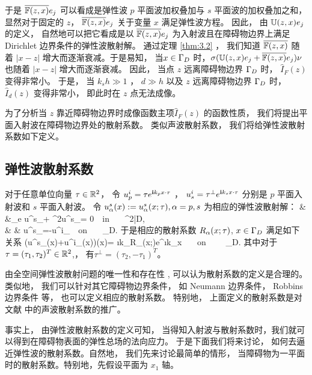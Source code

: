{于是 $\overline{\mathbb{F}(z,x)}e_j$ 可以看成是弹性波 $p$ 平面波加权叠加与 $s$ 平面波的加权叠加之和， 显然对于固定的 $z$， $\overline{\mathbb{F}(z,x)}e_j$ 关于变量 $x$ 满足弹性波方程。 因此， 由 $\mathbb{U}(z,x)e_j$ 的定义， 自然地可以把它看成是以 $\overline{\mathbb{F}(z,x)}e_j$ 为入射波且在障碍物边界上满足 Dirichlet 边界条件的弹性波散射解。 通过定理 \ref{thm:3.2} ， 我们知道 $\overline{\mathbb{F}(z,x)}$ 随着 $|x-z|$ 增大而逐渐衰减。于是易知， 当$x\in \Gamma_D$ 时，$\sigma(\mathbb{U}(z,x)e_j+\overline{\mathbb{F}(z,x)}e_j)\nu$ 也随着 $|x-z|$ 增大而逐渐衰减。 因此， 当点 $z$ 远离障碍物边界 $\Gamma_D$ 时， $\hat{I}_F(z)$ 变得非常小。 于是， 当 $k_s h \gg 1$ ， $d\gg h$ 以及 $z$ 远离障碍物边界 $\Gamma_D$ 时， $\hat{I}_d(z)$ 变得非常小， 即此时在 $z$ 点无法成像。

为了分析当 $z$ 靠近障碍物边界时成像函数主项$\hat{I}_F(z)$ 的函数性质， 我们将提出平面入射波在障碍物边界处的散射系数。 类似声波散射系数， 我们将给弹性波散射系数如下定义。
\subsection{弹性波散射系数}
\begin{definition}\label{scarr_con}
	对于任意单位向量 $\tau\in \mathbb{R}^2$， 令 $u^i_p =\tau e^{\mathbf{i} k_p x\cdot \tau}$ ，  $u^i_s= \tau^\perp e^{\mathbf{i} k_s x\cdot \tau}$ 分别是 $p$ 平面入射波和 $s$ 平面入射波。   令 $u^s_\alpha (x) := u^s_\alpha(x;\tau), \alpha=p,s$ 为相应的弹性波散射解：
	\be\label{sc1}
	& &\De_e u^s_\alpha + \om^2u^s_\alpha = 0\ \ \mbox{in }   \ \ \R^2\bks\bar{D}, \ \ \ \  \\
	& & u^s_\alpha =-u^i_\alpha \ \ \mbox{on }  \ \ \Ga_D.
	\ee
	于是相应的散射系数 $R_\alpha(x;\tau)$, $x\in\Gamma_D$ 满足如下关系
	\ben
	\sigma(u^s_\alpha(x)+u^i_\alpha(x))\nu(x)= \i k_\alpha R_\alpha(x;\tau)e^{\i k_\alpha x\cdot \tau}  \ \ \ \mbox{on } \ \ \  \Ga_D.
	\een
	其中对于 $\tau=(\tau_1,\tau_2)^T\in\mathbb{R}^2$,， 有$\tau^\perp=(\tau_2,-\tau_1)^T$。
\end{definition}
\begin{remark}
	由全空间弹性波散射问题的唯一性和存在性 \cite{cxz2016,ku63}, 可以认为散射系数的定义是合理的。 类似地， 我们可以针对其它障碍物边界条件， 如 Neumann 边界条件， Robbins 边界条件 等， 也可以定义相应的散射系数。 特别地， 上面定义的散射系数是对文献\cite{RTMhalf_aco} 中的声波散射系数的推广。
\end{remark}

事实上， 由弹性波散射系数的定义可知， 当得知入射波与散射系数时，我们就可以得到在障碍物表面的弹性总场的法向应力。 于是下面我们将来讨论， 如何去逼近弹性波的散射系数。自然地， 我们先来讨论最简单的情形， 当障碍物为一平面时的散射系数。特别地，先假设平面为 $x_1$ 轴。


}
